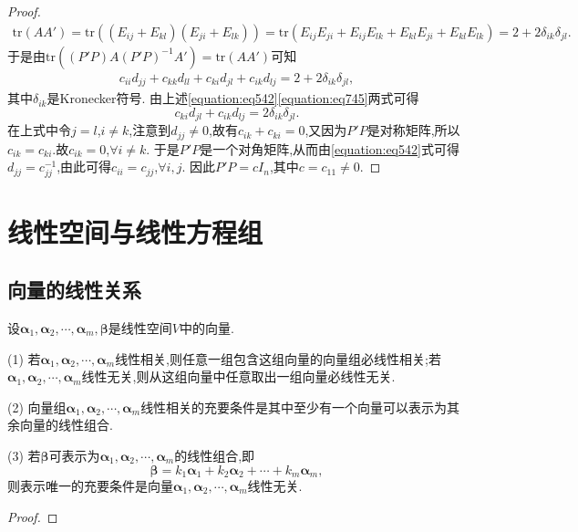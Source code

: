 \documentclass[lang=cn,newtx,10pt,scheme=chinese]{elegantbook}
\begin{document}
\begin{proof}
    \begin{align*}
        \mathrm{tr}\left( AA' \right) =\mathrm{tr}\left( \left( E_{ij}+E_{kl} \right) \left( E_{ji}+E_{lk} \right) \right) =\mathrm{tr}\left( E_{ij}E_{ji}+E_{ij}E_{lk}+E_{kl}E_{ji}+E_{kl}E_{lk} \right)=2 + 2\delta_{ik}\delta_{jl}.    
    \end{align*}
    于是由$\text{tr}((P'P)A(P'P)^{-1}A')=\text{tr}(AA')$可知
    \begin{align}\label{equation:eq745}
      c_{ii}d_{jj}+c_{kk}d_{ll}+c_{ki}d_{jl}+c_{ik}d_{lj}=2 + 2\delta_{ik}\delta_{jl},  
    \end{align}
    其中\(\delta_{ik}\)是Kronecker符号. 由上述\eqref{equation:eq542}\eqref{equation:eq745}两式可得
    \[
    c_{ki}d_{jl}+c_{ik}d_{lj}=2\delta_{ik}\delta_{jl}.
    \]
    在上式中令\(j = l\),\(i\neq k\),注意到\(d_{jj}\neq0\),故有\(c_{ik}+c_{ki}=0\),又因为\(P'P\)是对称矩阵,所以\(c_{ik}=c_{ki}\).故\(c_{ik}=0\),\(\forall i\neq k\). 于是\(P'P\)是一个对角矩阵,从而由\eqref{equation:eq542}式可得\(d_{jj}=c_{jj}^{-1}\),由此可得\(c_{ii}=c_{jj}\),\(\forall i,j\). 因此\(P'P = cI_n\),其中\(c = c_{11}\neq0\).
\end{proof}




\chapter{线性空间与线性方程组}

\section{向量的线性关系}

\begin{theorem}\label{theorem:向量的线性关系定理1}
设\(\boldsymbol{\alpha}_1,\boldsymbol{\alpha}_2,\cdots,\boldsymbol{\alpha}_m,\boldsymbol{\beta}\)是线性空间\(V\)中的向量.

(1) 若\(\boldsymbol{\alpha}_1,\boldsymbol{\alpha}_2,\cdots,\boldsymbol{\alpha}_m\)线性相关,则任意一组包含这组向量的向量组必线性相关;若\(\boldsymbol{\alpha}_1,\boldsymbol{\alpha}_2,\cdots,\boldsymbol{\alpha}_m\)线性无关,则从这组向量中任意取出一组向量必线性无关.

(2) 向量组\(\boldsymbol{\alpha}_1,\boldsymbol{\alpha}_2,\cdots,\boldsymbol{\alpha}_m\)线性相关的充要条件是其中至少有一个向量可以表示为其余向量的线性组合.

(3) 若\(\boldsymbol{\beta}\)可表示为\(\boldsymbol{\alpha}_1,\boldsymbol{\alpha}_2,\cdots,\boldsymbol{\alpha}_m\)的线性组合,即
\[
\boldsymbol{\beta}=k_1\boldsymbol{\alpha}_1 + k_2\boldsymbol{\alpha}_2+\cdots + k_m\boldsymbol{\alpha}_m,
\]
则表示唯一的充要条件是向量\(\boldsymbol{\alpha}_1,\boldsymbol{\alpha}_2,\cdots,\boldsymbol{\alpha}_m\)线性无关.
\end{theorem}
\begin{proof}
    
\end{proof}
\end{document}
